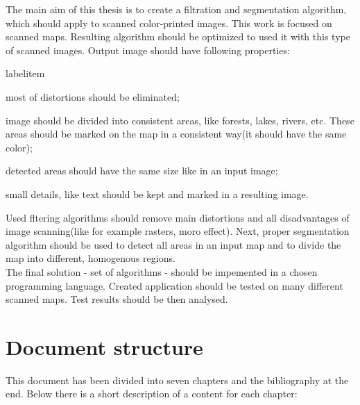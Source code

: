 \documentclass[a4paper,onecolumn,oneside,12pt]{memoir}
\makeatletter
\renewenvironment{itemize}{
  \begin{list}{  
  \csname labelitem\romannumeral\the\@listdepth\endcsname}{
  \setlength{\leftmargin}{1em}
	\setlength{\topsep}{6pt}%
	\setlength{\partopsep}{0pt}%
	\setlength{\parskip}{0pt}%
	\setlength{\parsep}{0pt}%
	\setlength{\itemsep}{0pt}}
}{
  \end{list}
}
\makeatother
\begin{document}
The main aim of this thesis is to create a filtration and segmentation algorithm, which should
apply to scanned color-printed images. This work is focused on scanned maps. 
Resulting algorithm should be optimized to used it with this type of scanned images. 
Output image should have following properties:

\begin{itemize}
  \item most of distortions should be eliminated;
  \item image should be divided into consistent areas, like forests, lakes, rivers, etc. These areas
        should be marked on the map in a consistent way(it should have the same color);
  \item detected areas should have the same size like in an input image;
  \item small details, like text should be kept and marked in a resulting image.
\end{itemize}

Used fltering algorithms should remove main distortions and all disadvantages of image scanning(like
for example rasters, moro effect). Next, proper segmentation algorithm should be used to detect all
areas in an input map and to divide the map into different, homogenous regions. \\

The final solution - set of algorithms - should be impemented in a chosen programming language.
Created application should be tested on many different scanned maps. Test results should be then
analysed.

\section{Document structure}

This document has been divided into seven chapters and the bibliography at the end.
Below there is a short description of a content for each chapter:
\end{document}

